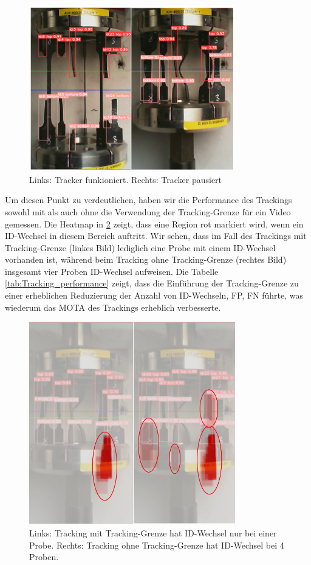 \begin{figure}[htbp]
 \centering
 \includegraphics[width=0.8\textwidth]{gfx/image_3.png}
 \caption{Links: Tracker funkioniert. Rechts: Tracker pausiert}
 \label{fig:part01:image_3}
\end{figure}

Um diesen Punkt zu verdeutlichen, haben wir die Performance des Trackings sowohl mit als auch ohne die Verwendung der Tracking-Grenze für ein Video gemessen. Die Heatmap in \ref{fig:part01:image_4} zeigt, dass eine Region rot markiert wird, wenn ein ID-Wechsel in diesem Bereich auftritt. Wir sehen, dass im Fall des Trackings mit Tracking-Grenze (linkes Bild) lediglich eine Probe mit einem ID-Wechsel vorhanden ist, während beim Tracking ohne Tracking-Grenze (rechtes Bild) insgesamt vier Proben ID-Wechsel aufweisen. Die Tabelle \ref{tab:Tracking_performance} zeigt, dass die Einführung der Tracking-Grenze  zu einer erheblichen Reduzierung der Anzahl von ID-Wechseln, \acs{FP}, \acs{FN} führte, was wiederum das \acs{MOTA} des Trackings erheblich verbesserte. 

\begin{figure}[htbp]
 \centering
 \includegraphics[width=0.8\textwidth]{gfx/image_4.png}
 \caption{Links: Tracking mit Tracking-Grenze hat ID-Wechsel nur bei einer Probe. Rechts: Tracking ohne Tracking-Grenze hat ID-Wechsel bei 4 Proben.}
 \label{fig:part01:image_4}
\end{figure}

